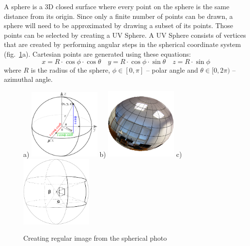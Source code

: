 \documentclass{svproc}
\begin{document}
A sphere is a 3D closed surface where every point on the sphere is the same distance from its origin. %
Since only a finite number of points can be drawn, a sphere will need to be approximated by drawing a subset of its points.
Those points can be selected by creating a UV Sphere.
A UV Sphere consists of vertices that are created by performing angular steps in the spherical coordinate system (fig.~\ref{fig:spheres}a).
Cartesian points are generated using these equations:
\begin{equation}
    x = R \cdot \cos \phi \cdot \cos \theta \quad y = R \cdot \cos \phi \cdot \sin \theta \quad z = R \cdot \sin \phi \nonumber
\end{equation}
where $R$ is the radius of the sphere, $\phi \in [0, \pi]$ -- polar angle and $\theta \in [0, 2\pi)$ -- azimuthal angle.

\begin{figure}[ht!]
    \centering
    a) \hspace{-3mm}\includegraphics[width=0.32\textwidth]{img/genpoint}
    b) \hspace{-3mm}\includegraphics[width=0.32\textwidth]{img/gl_sphere/textured}
    c) \hspace{-3mm}\includegraphics[width=0.32\textwidth]{img/sphere}
    \caption{Creating regular image from the spherical photo}
    \label{fig:spheres}
\end{figure}
\end{document}
